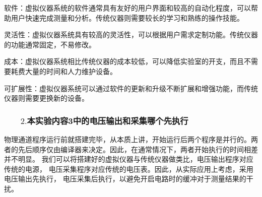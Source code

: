 \documentclass[12pt,a4paper]{article}
\begin{document}
    软件：虚拟仪器系统的软件通常具有友好的用户界面和较高的自动化程度，可以帮助用户快速完成测量和分析。传统仪器则需要较长的学习和熟练的操作技能。

    灵活性：虚拟仪器系统具有较高的灵活性，可以根据用户需求定制功能。传统仪器的功能通常固定，不易修改。

    成本：虚拟仪器系统相比传统仪器的成本较低，可以降低实验室的开支，而且不需要耗费大量的时间和人力维护设备。

    可扩展性：虚拟仪器系统可以通过软件的更新和升级不断扩展和增强功能，而传统仪器则需要更换新的设备。
    \subsubsection*{$\qquad2.$本实验内容3中的电压输出和采集哪个先执行}
    物理通道程序运行前就搭建完毕，从本质上讲，开始运行后两个程序是并行的。两者的先后顺序仅由编译器来决定。因此，在通常情况下，两者开始执行的时间相差并不明显。
    我们可以将搭建好的虚拟仪器与传统仪器做类比，电压输出程序对应传统的电源，
    电压采集程序对应传统的电压表。因此，从实际应用上考虑，采用电压输出先执行，
    电压采集后执行，以避免开启电路时的缓冲对于测量结果的干扰。
\end{document}
